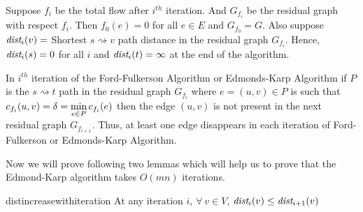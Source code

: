 Suppose $f_i$ be the total flow after $i^{th}$ iteration. And $G_{f_i}$ be the residual graph with respect $f_i$. Then $f_0(e)=0$ for all $e\in E$ and $G_{f_0}=G$. Also suppose $\emph{dist}_i(v)=$ Shortest $s\rightsquigarrow v$ path distance in the residual graph $G_{f_i}$. Hence, $\emph{dist}_i(s)=0$ for all $i$ and $\emph{dist}_i(t)=\infty$ at the end of the algorithm.
\begin{note}
	In $i^{th}$ iteration of the Ford-Fulkerson Algorithm or Edmonds-Karp Algorithm if $P$ is the $s\rightsquigarrow t$ path in the residual graph $G_{f_i}$ where $e=(u,v)\in P$  is such that $c_{f_i}(u,v)=\delta=\min\limits_{e\in P}c_{f_i}(e)$ then the edge $(u,v)$ is not present in the next residual graph $G_{f_{i+1}}$. Thus, at least one edge disappears in each iteration of Ford-Fulkerson or Edmonds-Karp Algorithm.
\end{note}
Now we will prove following two lemmas which will help us to prove that the Edmond-Karp algorithm takes $O(mn)$ iterations.
\begin{lemma}{}{distincreasewithiteration}
	At any iteration $i$, 	$\forall\ v\in V$, $\emph{dist}_i(v)\leq\emph{dist}_{i+1}(v)$
\end{lemma}
